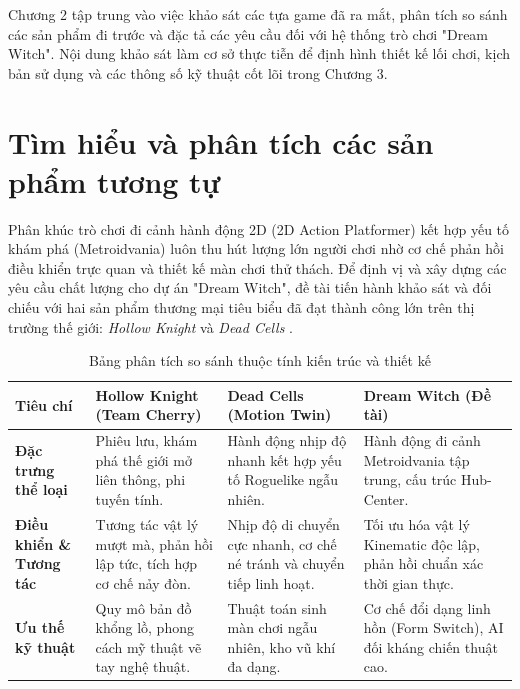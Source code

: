 \documentclass[../DoAn.tex]{subfiles}
\begin{document}
Chương 2 tập trung vào việc khảo sát các tựa game đã ra mắt, phân tích so sánh các sản phẩm đi trước và đặc tả các yêu cầu đối với hệ thống trò chơi "Dream Witch". Nội dung khảo sát làm cơ sở thực tiễn để định hình thiết kế lối chơi, kịch bản sử dụng và các thông số kỹ thuật cốt lõi trong Chương 3.

\section{Tìm hiểu và phân tích các sản phẩm tương tự}
\label{section:2.1}

Phân khúc trò chơi đi cảnh hành động 2D (2D Action Platformer) kết hợp yếu tố khám phá (Metroidvania) luôn thu hút lượng lớn người chơi nhờ cơ chế phản hồi điều khiển trực quan và thiết kế màn chơi thử thách. Để định vị và xây dựng các yêu cầu chất lượng cho dự án "Dream Witch", đề tài tiến hành khảo sát và đối chiếu với hai sản phẩm thương mại tiêu biểu đã đạt thành công lớn trên thị trường thế giới: \textit{Hollow Knight} \cite{hollowknightgame} và \textit{Dead Cells} \cite{deadcellsgame}.

\begin{table}[H]
\centering
\caption{Bảng phân tích so sánh thuộc tính kiến trúc và thiết kế}
\label{tab:so_sanh_game}
\begin{tabularx}{\textwidth}{|L|L|L|L|}
\hline
\textbf{Tiêu chí} & \textbf{Hollow Knight} (Team Cherry) & \textbf{Dead Cells} (Motion Twin) & \textbf{Dream Witch} (Đề tài) \\ \hline
\textbf{Đặc trưng thể loại} & Phiêu lưu, khám phá thế giới mở liên thông, phi tuyến tính. & Hành động nhịp độ nhanh kết hợp yếu tố Roguelike ngẫu nhiên. & Hành động đi cảnh Metroidvania tập trung, cấu trúc Hub-Center. \\ \hline
\textbf{Điều khiển \& Tương tác} & Tương tác vật lý mượt mà, phản hồi lập tức, tích hợp cơ chế nảy đòn. & Nhịp độ di chuyển cực nhanh, cơ chế né tránh và chuyển tiếp linh hoạt. & Tối ưu hóa vật lý Kinematic độc lập, phản hồi chuẩn xác thời gian thực. \\ \hline
\textbf{Ưu thế kỹ thuật} & Quy mô bản đồ khổng lồ, phong cách mỹ thuật vẽ tay nghệ thuật. & Thuật toán sinh màn chơi ngẫu nhiên, kho vũ khí đa dạng. & Cơ chế đổi dạng linh hồn (Form Switch), AI đối kháng chiến thuật cao. \\ \hline
\end{tabularx}
\end{table}
\end{document}
